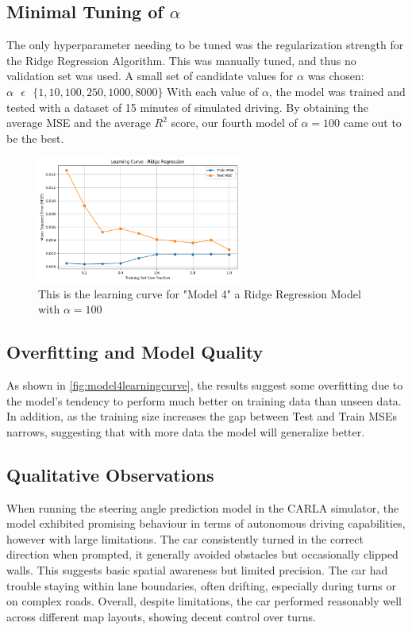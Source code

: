 \documentclass{article} %
\begin{document}
\subsection{Minimal Tuning of $\alpha$}
The only hyperparameter needing to be tuned was the regularization strength for the Ridge Regression Algorithm. This was manually tuned,
and thus no validation set was used. A small set of candidate values for $\alpha$ was chosen: $\alpha \text{ } \epsilon \text{ }
    \{ 1, 10, 100, 250, 1000, 8000\}$ With each value of $\alpha$, the model was trained and tested with a dataset of 15 minutes of simulated
driving. By obtaining the average MSE and the average $R^2$ score, our fourth model of $\alpha = 100$ came out to be the best.


\begin{figure}[H] %
    \centering
    \includegraphics[width=0.6\textwidth]{model4learningcurve.png} %
    \caption{This is the learning curve for "Model 4" a Ridge Regression Model with $\alpha = 100$}
    \label{fig:model4learningcurve}
\end{figure}

\subsection{Overfitting and Model Quality}
As shown in \autoref{fig:model4learningcurve}, the results suggest some overfitting due to the model's tendency
to perform much better on training data than unseen data. In addition, as the training size
increases the gap between Test and Train MSEs narrows, suggesting that with more data the model will generalize better.


\subsection{Qualitative Observations}
When running the steering angle prediction model in the CARLA simulator, the model exhibited promising behaviour in terms of
autonomous driving capabilities, however with large limitations. The car consistently turned in the correct direction when prompted,
it generally avoided obstacles but occasionally clipped walls. This suggests basic spatial awareness but limited precision. The car had trouble staying within lane boundaries,
often drifting, especially during turns or on complex roads. Overall, despite limitations, the car performed reasonably well across different map layouts, showing decent control over turns.
\end{document}
